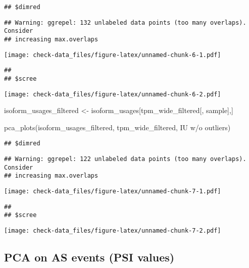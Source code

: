 \documentclass[
]{article}
\newenvironment{Shaded}{\begin{snugshade}}{\end{snugshade}}
\newcommand{\FunctionTok}[1]{\textcolor[rgb]{0.00,0.00,0.00}{#1}}
\newcommand{\NormalTok}[1]{#1}
\newcommand{\OtherTok}[1]{\textcolor[rgb]{0.56,0.35,0.01}{#1}}
\newcommand{\StringTok}[1]{\textcolor[rgb]{0.31,0.60,0.02}{#1}}
\begin{document}
\begin{verbatim}
## $dimred
\end{verbatim}

\begin{verbatim}
## Warning: ggrepel: 132 unlabeled data points (too many overlaps). Consider
## increasing max.overlaps
\end{verbatim}

\texttt{[image: check-data\_files/figure-latex/unnamed-chunk-6-1.pdf]}

\begin{verbatim}
## 
## $scree
\end{verbatim}

\texttt{[image: check-data\_files/figure-latex/unnamed-chunk-6-2.pdf]}

\begin{Shaded}
\begin{Highlighting}[]
\NormalTok{isoform\_usages\_filtered }\OtherTok{\textless{}{-}}\NormalTok{ isoform\_usages[tpm\_wide\_filtered[, sample],]}

\FunctionTok{pca\_plots}\NormalTok{(isoform\_usages\_filtered, tpm\_wide\_filtered, }\StringTok{\textquotesingle{}IU w/o outliers\textquotesingle{}}\NormalTok{)}
\end{Highlighting}
\end{Shaded}

\begin{verbatim}
## $dimred
\end{verbatim}

\begin{verbatim}
## Warning: ggrepel: 122 unlabeled data points (too many overlaps). Consider
## increasing max.overlaps
\end{verbatim}

\texttt{[image: check-data\_files/figure-latex/unnamed-chunk-7-1.pdf]}

\begin{verbatim}
## 
## $scree
\end{verbatim}

\texttt{[image: check-data\_files/figure-latex/unnamed-chunk-7-2.pdf]}

\hypertarget{pca-on-as-events-psi-values}{%
\subsection{PCA on AS events (PSI
values)}\label{pca-on-as-events-psi-values}}
\end{document}
